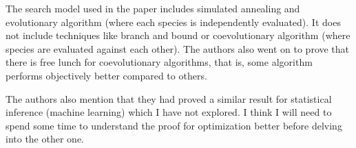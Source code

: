 \documentclass[12pt]{article}
\begin{document}
The search model used in the paper includes simulated annealing and evolutionary algorithm (where each species is independently evaluated). It does not include techniques like branch and bound or coevolutionary algorithm (where species are evaluated against each other). The authors also went on to prove that there is free lunch for coevolutionary algorithms, that is, some algorithm performs objectively better compared to others.

The authors also mention that they had proved a similar result for statistical inference (machine learning) which I have not explored. I think I will need to spend some time to understand the proof for optimization better before delving into the other one.
\end{document}
